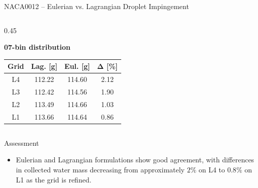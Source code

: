 \begin{frame}{\small NACA0012 -- Eulerian vs. Lagrangian Droplet Impingement}
\begin{columns}[T,onlytextwidth]
\begin{column}{0.45\textwidth}
\vspace{0.30cm}

\textbf{07-bin distribution}

\vspace{0.10cm}

\begin{tabular}{c|cc|c}
    \toprule
    \textbf{Grid}
    & \textbf{Lag. [g]}
    & \textbf{Eul. [g]}
    & $\boldsymbol{\Delta}$ \textbf{[\%]} \\
    \midrule
    L4 & 112.22 & 114.60 & 2.12 \\
    L3 & 112.42 & 114.56 & 1.90 \\
    L2 & 113.49 & 114.66 & 1.03 \\
    L1 & 113.66 & 114.64 & 0.86 \\
    \bottomrule
\end{tabular}

\end{column}

\end{columns}

\vspace{0.20cm}

\begin{block}{\scriptsize Assessment}
\begin{itemize}
    \item Eulerian and Lagrangian formulations show good agreement, with differences in collected water mass decreasing from approximately $2\%$ on L4 to $0.8\%$ on L1 as the grid is refined.
\end{itemize}
\end{block}

\end{frame}



